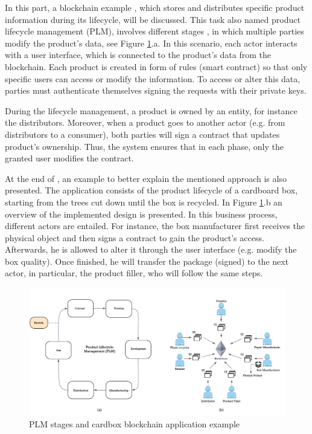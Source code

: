 In this part, a blockchain example \citep{abeyratne2016blockchain}, which stores and distributes specific product information during its lifecycle, will be discussed. This task also named product lifecycle management (PLM), involves different stages \citep{stark2015product}, in which multiple parties modify the product's data, see Figure \ref{fig:supplyChain}.a. In this scenario, each actor interacts with a user interface, which is connected to the product's data from the blockchain. Each product is created in form of rules (smart contract) so that only specific users can access or modify the information. To access or alter this data, parties must authenticate themselves signing the requests with their private keys. 

During the lifecycle management, a product is owned by an entity, for instance the distributors. Moreover, when a product goes to another actor (e.g. from distributors to a consumer), both parties will sign a contract that updates product's ownership. Thus, the system ensures that in each phase, only the granted user modifies the contract.

At the end of \citep{abeyratne2016blockchain}, an example to better explain the mentioned approach is also presented. The application consists of the product lifecycle of a cardboard box, starting from the trees cut down until the box is recycled. In Figure \ref{fig:supplyChain}.b an overview of the implemented design is presented. In this business process, different actors are entailed. For instance, the box manufacturer first receives the physical object and then signs a contract to gain the product's access. Afterwards, he is allowed to alter it through the user interface (e.g. modify the box quality). Once finished, he will transfer the package (signed) to the next actor, in particular, the product filler, who will follow the same steps.

\begin{figure}
	\centering
	\includegraphics[width=1\linewidth]{gfx/supplyChain}    
  \caption{ PLM stages and cardbox blockchain application example \citep{stark2015product}}
  \label{fig:supplyChain}
\end{figure}

